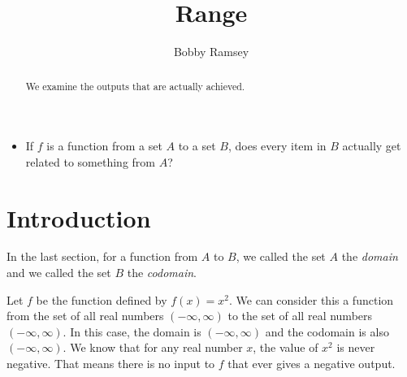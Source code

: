 \documentclass[nooutcomes]{ximera}
\author{Bobby Ramsey}
\title{Range}
\begin{document}
\licenseORCCA
\begin{abstract}
 	We examine the outputs that are actually achieved.
\end{abstract}
\maketitle



\begin{motivatingQuestions}\begin{itemize}
	\item If $f$ is a function from a set $A$ to a set $B$, does every item in $B$ actually get related to something from $A$?
\end{itemize}\end{motivatingQuestions}

\section{Introduction}

	In the last section, for a function from $A$ to $B$,  we called the set $A$ the \emph{domain} and we called the set $B$ the \emph{codomain}.
	
	Let $f$ be the function defined by $f(x) = x^2$. We can consider this a function from the set of all real numbers $(-\infty, \infty)$ to the set of all 
	real numbers $(-\infty, \infty)$. In this case, the domain is $(-\infty, \infty)$ and the codomain is also $(-\infty, \infty)$.
	We know that for any real number $x$, the value of $x^2$ is never negative. That means there is no input to $f$ that ever gives a negative output.
		
\end{document}
